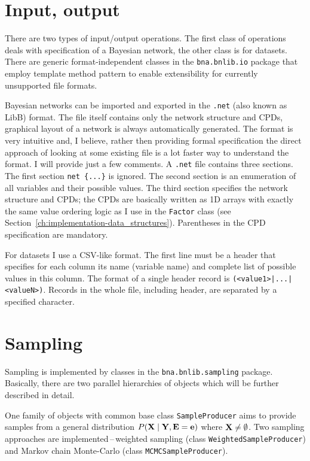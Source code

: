 \documentclass[english,cover]{fitthesis} %
\newcommand{\srccode}[1]{{\tt #1}}         %
\newcommand{\vars}[1]{{\bold{#1}}}         %
\begin{document}
\section{Input, output}
There are two types of input/output operations. The first class of operations deals with specification of a Bayesian network, the other class is for datasets. There are generic format-independent classes in the \srccode{bna.bnlib.io} package that employ template method pattern to enable extensibility for currently unsupported file formats.

Bayesian networks can be imported and exported in the \srccode{.net} (also known as LibB) format. The file itself contains only the network structure and CPDs, graphical layout of a network is always automatically generated. The format is very intuitive and, I believe, rather then providing formal specification the direct approach of looking at some existing file is a lot faster way to understand the format. I will provide just a few comments. A \srccode{.net} file contains three sections. The first section \srccode{net \{...\}} is ignored. The second section is an enumeration of all variables and their possible values. The third section specifies the network structure and CPDs; the CPDs are basically written as 1D arrays with exactly the same value ordering logic as I use in the \srccode{Factor} class (see Section~\ref{ch:implementation-data_structures}). Parentheses in the CPD specification are mandatory.

For datasets I use a CSV-like format. The first line must be a header that specifies for each column its name (variable name) and complete list of possible values in this column. The format of a single header record is \srccode{<variable-name>(<value1>|...|<valueN>)}. Records in the whole file, including header, are separated by a specified character. 






\section{Sampling}
Sampling is implemented by classes in the \srccode{bna.bnlib.sampling} package. Basically, there are two parallel hierarchies of objects which will be further described in detail.

One family of objects with common base class \srccode{SampleProducer} aims to provide samples from a general distribution $P(\vars{X} \mid \vars{Y}, \vars{E} = \vars{e})$ where $\vars{X} \neq \emptyset$. Two sampling approaches are implemented\,--\,weighted sampling (class \srccode{WeightedSampleProducer}) and Markov chain Monte-Carlo (class \srccode{MCMCSampleProducer}).
\end{document}
